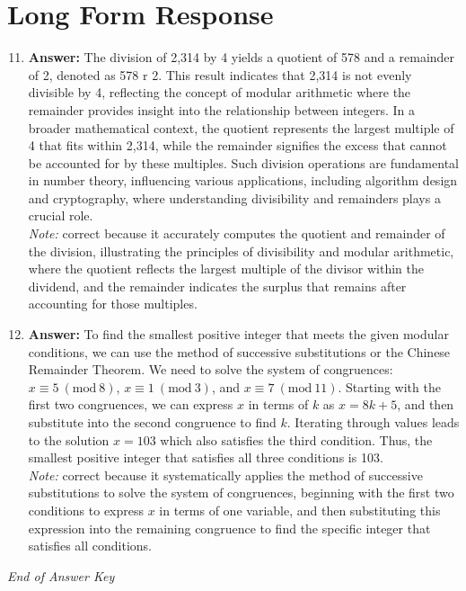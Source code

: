 \documentclass[12pt]{article}
\begin{document}
\section*{Long Form Response}
\begin{enumerate}[label=\arabic*.]
\setcounter{enumi}{10}
\item \textbf{Answer:} The division of 2,314 by 4 yields a quotient of 578 and a remainder of 2, denoted as 578 r 2. This result indicates that 2,314 is not evenly divisible by 4, reflecting the concept of modular arithmetic where the remainder provides insight into the relationship between integers. In a broader mathematical context, the quotient represents the largest multiple of 4 that fits within 2,314, while the remainder signifies the excess that cannot be accounted for by these multiples. Such division operations are fundamental in number theory, influencing various applications, including algorithm design and cryptography, where understanding divisibility and remainders plays a crucial role.
\\ \textit{Note:} correct because it accurately computes the quotient and remainder of the division, illustrating the principles of divisibility and modular arithmetic, where the quotient reflects the largest multiple of the divisor within the dividend, and the remainder indicates the surplus that remains after accounting for those multiples.
\item \textbf{Answer:} To find the smallest positive integer that meets the given modular conditions, we can use the method of successive substitutions or the Chinese Remainder Theorem. We need to solve the system of congruences: \( x \equiv 5 \ (\text{mod} \ 8) \), \( x \equiv 1 \ (\text{mod} \ 3) \), and \( x \equiv 7 \ (\text{mod} \ 11) \). Starting with the first two congruences, we can express \( x \) in terms of \( k \) as \( x = 8 k + 5 \), and then substitute into the second congruence to find \( k \). Iterating through values leads to the solution \( x = 103 \) which also satisfies the third condition. Thus, the smallest positive integer that satisfies all three conditions is 103.
\\ \textit{Note:} correct because it systematically applies the method of successive substitutions to solve the system of congruences, beginning with the first two conditions to express \( x \) in terms of one variable, and then substituting this expression into the remaining congruence to find the specific integer that satisfies all conditions.
\end{enumerate}

\vfill
\noindent\textit{End of Answer Key}
\end{document}
